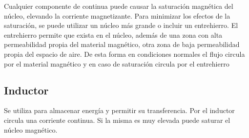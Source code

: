 Cualquier componente de continua puede causar la saturación magnética del núcleo, 
elevando la corriente magnetizante. 
Para minimizar los efectos de la saturación, se puede utilizar un núcleo más grande o incluir un entrehierro.
El entrehierro permite que exista en el núcleo, además de una zona con alta permeabilidad propia del material magnético, 
otra zona de baja permeabilidad propia del espacio de aire. 
De esta forma en condiciones normales el flujo circula por el material magnético y en caso de saturación circula por el entrehierro 

\subsection{Inductor}

Se utiliza para almacenar energía y permitir su transferencia. 
Por el inductor circula una corriente continua. Si la misma es muy elevada puede saturar el núcleo magnético. 